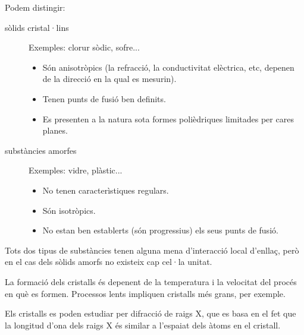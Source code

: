 Podem distingir:
\begin{description}
\item[sòlids cristal·lins] Exemples: clorur sòdic, sofre... 
\begin{itemize}
\item Són anisotròpics (la refracció, la conductivitat elèctrica, etc, depenen de la direcció en la qual es mesurin). 
\item Tenen punts de fusió ben definits. 
\item Es presenten a la natura sota formes polièdriques limitades per cares planes.
\end{itemize}
\item[substàncies amorfes] Exemples: vidre, plàstic... \begin{itemize}
\item No tenen caracterìstiques regulars. 
\item Són isotròpics. 
\item No estan ben establerts (són progressius) els seus punts de fusió.
\end{itemize}
\end{description}
Tots dos tipus de substàncies tenen alguna mena d'interacció local d'enllaç, però en el cas dels sòlids amorfs no existeix cap cel·la unitat.

La formació dels cristalls és depenent de la temperatura i la velocitat del procés en què es formen. Processos lents impliquen cristalls més grans, per exemple.

Els cristalls es poden estudiar per difracció de raigs X, que es basa en el fet que la longitud d'ona dels raigs X és similar a l'espaiat dels àtoms en el cristall. 

